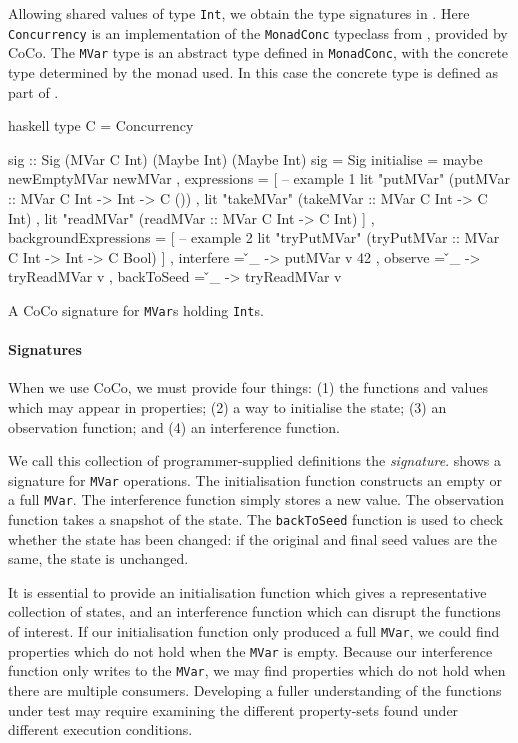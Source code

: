 Allowing shared values of type \verb|Int|, we obtain the type
signatures in .  Here \verb|Concurrency| is an
implementation of the \verb|MonadConc| typeclass from
, provided by CoCo.  The \verb|MVar| type is an
abstract type defined in \verb|MonadConc|, with the concrete type
determined by the monad used.  In this case the concrete type is
defined as part of \dejafu{}.

\begin{listing}
\centering
\begin{cminted}{haskell}
type C = Concurrency

sig :: Sig (MVar C Int) (Maybe Int) (Maybe Int)
sig = Sig
  { initialise  = maybe newEmptyMVar newMVar
  , expressions =
    [ -- example 1
      lit "putMVar"  (putMVar  :: MVar C Int -> Int -> C ())
    , lit "takeMVar" (takeMVar :: MVar C Int -> C Int)
    , lit "readMVar" (readMVar :: MVar C Int -> C Int)
    ]
  , backgroundExpressions =
    [ -- example 2
      lit "tryPutMVar" (tryPutMVar :: MVar C Int -> Int -> C Bool)
    ]
  , interfere  = \v _ -> putMVar v 42
  , observe    = \v _ -> tryReadMVar v
  , backToSeed = \v _ -> tryReadMVar v
  }
\end{cminted}
\caption{A CoCo signature for \texttt{MVar}s holding \texttt{Int}s.}\label{lst:mvar}
\end{listing}

\paragraph{Signatures}
When we use CoCo, we must provide four things: (1) the functions and
values which may appear in properties; (2) a way to initialise the
state; (3) an observation function; and (4) an interference function.

We call this collection of programmer-supplied definitions the
\emph{signature}.   shows a signature for \verb|MVar|
operations.  The initialisation function constructs an empty or a full
\verb|MVar|.  The interference function simply stores a new value.
The observation function takes a snapshot of the state.  The
\verb|backToSeed| function is used to check whether the state has been
changed: if the original and final seed values are the same, the state
is unchanged.

It is essential to provide an initialisation function which gives a
representative collection of states, and an interference function
which can disrupt the functions of interest.  If our initialisation
function only produced a full \verb|MVar|, we could find properties
which do not hold when the \verb|MVar| is empty.  Because our
interference function only writes to the \verb|MVar|, we may find
properties which do not hold when there are multiple consumers.
Developing a fuller understanding of the functions under test may
require examining the different property-sets found under different
execution conditions.

